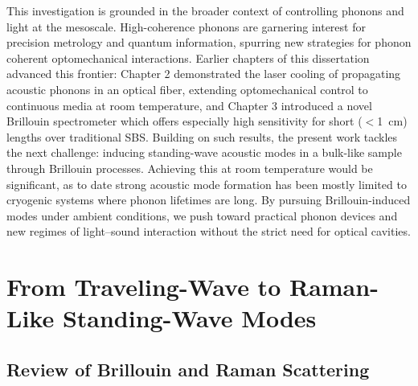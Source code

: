 This investigation is grounded in the broader context of controlling phonons and light at the mesoscale. High-coherence phonons are garnering interest for precision metrology and quantum information, \cite{balram2016coherent, schliesser2014cavity} spurring new strategies for phonon coherent optomechanical interactions. \cite{kippenberg2008cavity, aspelmeyer2014cavity} Earlier chapters of this dissertation advanced this frontier: Chapter 2 demonstrated the laser cooling of propagating acoustic phonons in an optical fiber, extending optomechanical control to continuous media at room temperature, \cite{johnson2023laser} and Chapter 3 introduced a novel Brillouin spectrometer which offers especially high sensitivity for short (\(<\)\SI{1}{\centi\meter}) lengths over traditional \ac{SBS}. Building on such results, the present work tackles the next challenge: inducing standing-wave acoustic modes in a bulk-like sample through Brillouin processes. Achieving this at room temperature would be significant, as to date strong acoustic mode formation has been mostly limited to cryogenic systems where phonon lifetimes are long. \cite{otterstrom2018optomechanical, galliou2013extremely} By pursuing Brillouin-induced modes under ambient conditions, we push toward practical phonon devices and new regimes of light–sound interaction without the strict need for optical cavities. \cite{pant2011chip}


\section{From Traveling-Wave to Raman-Like Standing-Wave Modes}
\label{sec:Raman:FromTraveling-WavetoRaman-LikeStanding-WaveModes}

\subsection{Review of Brillouin and Raman Scattering}
\label{subsec:Raman:ReviewofBrillouinandRamanScattering}

